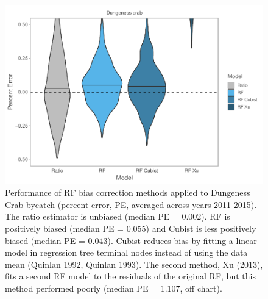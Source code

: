 \documentclass[]{article}
\begin{document}
\begin{figure}[H]

{\centering \includegraphics[width=6in]{bycatch_sim_paper_supplement_files/figure-latex/rf-cubist-1} 

}

\caption[Performance of RF bias correction methods (percent error, PE, averaged across years 2011-2015).]{Performance of RF bias correction methods applied to Dungeness Crab bycatch (percent error, PE, averaged across years 2011-2015). The ratio estimator is unbiased (median PE = 0.002). RF is positively biased (median PE = 0.055) and Cubist is less positively biased (median PE = 0.043). Cubist reduces bias by fitting a linear model in regression tree terminal nodes instead of using the data mean (Quinlan 1992, Quinlan 1993). The second method, Xu (2013), fits a second RF model to the residuals of the original RF, but this method performed poorly (median PE = 1.107, off chart).}\label{fig:rf-cubist}
\end{figure}
\end{document}
